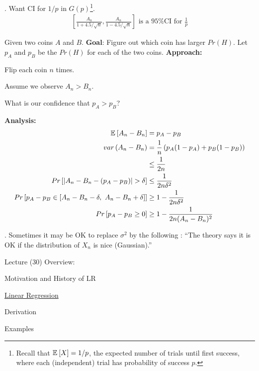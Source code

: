 \documentclass[12pt]{article}
\newcommand{\myspace}{\vspace{2\bigskipamount}}
\newcommand\p{\Needspace{12\baselineskip} \noindent}
\begin{document}
\myspace
\p {}. Want CI for $1/p$ in $G(p)$\footnote{Recall that $\mathbb{E}_{}\left[X\right] = 1/p$, the expected number of trials until first success, where each (independent) trial has probability of success $p$.}. \Theorem[Let $X_n$ be i.i.d. $G(p)$. As usual define $A_n = (X_1 + \cdots + X_n)/n$. Then]
\begin{align}
\left[ \frac{A_n}{1 + 4.5/\sqrt{n}}, \frac{A_n}{1 - 4.5/\sqrt{n}}	\right] \text{ is a 95\% CI for } \frac{1}{p}
\end{align}


\myspace 
\p {} Given two coins $A$ and $B$. \textbf{Goal}: Figure out which coin has larger $Pr(H)$. Let $p_A$ and $p_B$ be the $Pr(H)$ for each of the two coins. \textbf{Approach:}
\begin{compactitem}[$\rightarrow$]
	\item Flip each coin $n$ times.
	\item Assume we observe $A_n > B_n$. 
	\item What is our confidence that $p_A > p_B$?
\end{compactitem}
\textbf{Analysis:} 
\begin{align}
\mathbb{E}_{}\left[A_n - B_n\right] &= p_A - p_B \\
var\left(A_n - B_n\right) &= \frac{1}{n}\left(p_A (1 - p_A) + p_B(1 - p_B)\right) \\
&\le \frac{1}{2n} \\
Pr\left[  |A_n - B_n - (p_A - p_B)| > \delta \right] &\le \frac{1}{2n\delta^2} \\
Pr\left[ p_A - p_B \in \left[A_n - B_n - \delta,~ A_n - B_n + \delta\right] \right] &\ge 1 - \frac{1}{2n\delta^2} \\
Pr\left[ p_A - p_B \ge 0 \right] &\ge 1  - \frac{1}{2n(A_n - B_n)^2}
\end{align}


\myspace
\p {}. Sometimes it may be OK to replace $\sigma^2$ by the following :
``The theory says it is OK if the distribution of $X_n$ is nice (Gaussian).''





\p Lecture (30) Overview:
\begin{compactitem}
	\item Motivation and History of LR
	\item \hyperref[LR]{Linear Regression}
	\item Derivation
	\item Examples
\end{compactitem}
\end{document}
